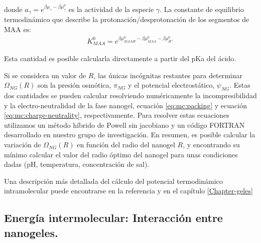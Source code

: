	\noindent donde $a_\gamma = e^{\beta\mu_\gamma-\beta\mu_\gamma^0}$ es la actividad de la especie $\gamma$. 
	La constante de equilibrio termodin\'amico que describe la protonaci\'on/desprotonaci\'on de los segmentos de MAA es:
	\begin{align}
		K^0_{MAA}= e^{\beta\mu^0_{MAAH}-\beta\mu^0_{MAA}-\beta\mu^0_{H^+}}
	\end{align}
	
	\noindent Esta cantidad es posible calcularla directamente a partir del pKa del \'acido.
	
	
	Si se considera  un valor de  $R$, las \'unicas inc\'ognitas restantes para determinar $\Omega_{NG}(R)$ son la presi\'on osm\'otica, $\pi_{NG}$ y el potencial electrost\'atico, $\psi_{NG}$.
	Estas dos cantidades se pueden calcular resolviendo num\'ericamente la incompresibilidad y la electro-neutralidad de la fase nanogel, ecuaci\'on \ref{eq:mc:packing} y ecuaci\'on \ref{eq:mc:charge-neutrality}, respectivamente.
	Para resolver estas ecuaciones utilizamos un m\'etodo h\'ibrido de Powell sin jacobiano y un c\'odigo FORTRAN desarrollado en nuestro grupo de investigaci\'on.
	En resumen, es posible calcular la variaci\'on de  $\Omega_{NG}(R)$ en funci\'on del radio del nanogel $R$, y encontrando su m\'inimo calcular el valor del radio \'optimo del nanogel para unas condiciones dadas (pH, temperatura, concentraci\'on de sal).
	
	Una descripci\'on m\'as detallada del c\'alculo del potencial termodin\'amico intramolecular puede encontrarse en la referencia  \cite{perez2021thermodynamic} y en el cap\'itulo \ref{Chapter-geles}
	
	\subsection{Energ\'ia intermolecular: Interacci\'on entre nanogeles.}\label{sec:mc:energia_intra}
	

	
